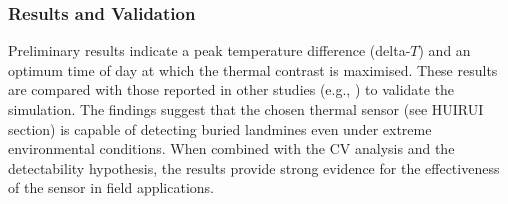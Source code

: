     \subsubsection{Results and Validation}
    
        Preliminary results indicate a peak temperature difference (delta-\(T\)) and an optimum time of day at which the thermal contrast is maximised. These results are compared with those reported in other studies (e.g., \cite{dummyRef3}) to validate the simulation. The findings suggest that the chosen thermal sensor (see HUIRUI section) is capable of detecting buried landmines even under extreme environmental conditions. When combined with the CV analysis and the detectability hypothesis, the results provide strong evidence for the effectiveness of the sensor in field applications.
    

